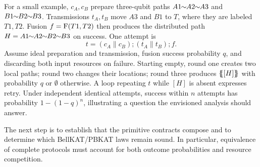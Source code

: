 For a small example, $c_A,c_B$ prepare three-qubit paths $A1\edge A2\edge A3$ and $B1\edge B2\edge B3$. Transmissions $t_A,t_B$ move $A3$ and $B1$ to $T$, where they are labeled $T1,T2$. Fusion $f=\mathrm{F}(T1,T2)$ then produces the distributed path $H=A1\edge A2\edge B2\edge B3$ on success. One attempt is
\[
t=(c_A\parallel c_B);(t_A\parallel t_B);f.
\]
Assume ideal preparation and transmission, fusion success probability $q$, and discarding both input resources on failure. Starting empty, round one creates two local paths; round two changes their locations; round three produces $\{\!\!\{[H]\}\!\!\}$ with probability $q$ or $\emptyset$ otherwise. A loop repeating $t$ while $[H]$ is absent expresses retry. Under independent identical attempts, success within $n$ attempts has probability $1-(1-q)^n$, illustrating a question the envisioned analysis should answer.

The next step is to establish that the primitive contracts compose and to determine which BellKAT/PBKAT laws remain sound. In particular, equivalence of complete protocols must account for both outcome probabilities and resource competition.

